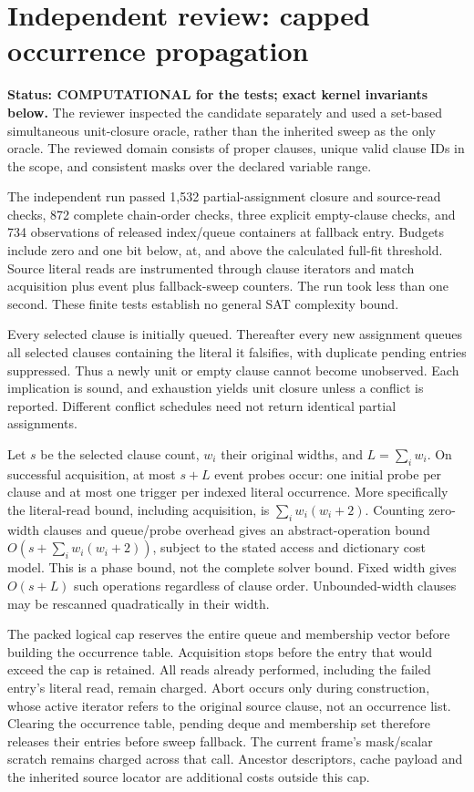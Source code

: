 \section*{Independent review: capped occurrence propagation}
\textbf{Status: COMPUTATIONAL for the tests; exact kernel invariants below.}
The reviewer inspected the candidate separately and used a set-based simultaneous
unit-closure oracle, rather than the inherited sweep as the only oracle.
The reviewed domain consists of proper clauses, unique valid clause IDs in the
scope, and consistent masks over the declared variable range.

The independent run passed 1,532 partial-assignment closure and source-read
checks, 872 complete chain-order checks, three explicit empty-clause checks, and
734 observations of released index/queue containers at fallback entry.
Budgets include zero and one bit below, at, and above the calculated full-fit
threshold. Source literal reads are instrumented through clause iterators and
match acquisition plus event plus fallback-sweep counters. The run took less
than one second. These finite tests establish no general SAT complexity bound.

Every selected clause is initially queued. Thereafter every new assignment
queues all selected clauses containing the literal it falsifies, with duplicate
pending entries suppressed. Thus a newly unit or empty clause cannot become
unobserved. Each implication is sound, and exhaustion yields unit closure
unless a conflict is reported. Different conflict schedules need not return
identical partial assignments.

Let $s$ be the selected clause count, $w_i$ their original widths, and
$L=\sum_i w_i$. On successful acquisition, at most $s+L$ event probes occur:
one initial probe per clause and at most one trigger per indexed literal
occurrence. More specifically the literal-read bound, including acquisition,
is $\sum_i w_i(w_i+2)$. Counting zero-width clauses and queue/probe overhead gives
an abstract-operation bound $O(s+\sum_i w_i(w_i+2))$, subject to the stated
access and dictionary cost model. This is a phase bound, not the complete
solver bound. Fixed width gives $O(s+L)$ such operations regardless of clause
order. Unbounded-width clauses may be rescanned quadratically in their width.

The packed logical cap reserves the entire queue and membership vector before
building the occurrence table. Acquisition stops before the entry that would
exceed the cap is retained. All reads already performed, including the failed
entry's literal read, remain charged. Abort occurs only during construction,
whose active iterator refers to the original source clause, not an occurrence
list. Clearing the occurrence table, pending deque and membership set therefore
releases their entries before sweep fallback. The current frame's mask/scalar
scratch remains charged across that call. Ancestor descriptors, cache payload
and the inherited source locator are additional costs outside this cap.

